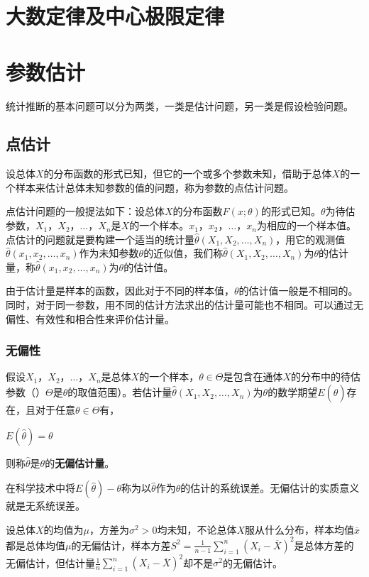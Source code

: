 \documentclass[11pt]{book}
\newcounter{#2}
\newcounter{#2}[#1]
\numberwithin{#2}{#1}
\begin{document}
	\chapter{大数定律及中心极限定律}
	\chapter{参数估计}
	统计推断的基本问题可以分为两类，一类是估计问题，另一类是假设检验问题。
	\section{点估计}
	\begin{newdef}
		设总体$X$的分布函数的形式已知，但它的一个或多个参数未知，借助于总体$X$的一个样本来估计总体未知参数的值的问题，称为参数的点估计问题。
	\end{newdef}
点估计问题的一般提法如下：设总体$X$的分布函数$F(x;\theta)$的形式已知。$\theta$为待估参数，$X_1$，$X_2$，$\dots$，$X_n$是$X$的一个样本。$x_1$，$x_2$，$\dots$，$x_n$为相应的一个样本值。点估计的问题就是要构建一个适当的统计量$\hat{\theta}(X_1,X_2,\dots,X_n)$，用它的观测值$\hat{\theta}(x_1,x_2,\dots,x_n)$作为未知参数$\theta$的近似值，我们称$\hat{\theta}(X_1,X_2,\dots,X_n)$为$\theta$的估计量，称$\hat{\theta}(x_1,x_2,\dots,x_n)$为$\theta$的估计值。

由于估计量是样本的函数，因此对于不同的样本值，$\theta$的估计值一般是不相同的。同时，对于同一参数，用不同的估计方法求出的估计量可能也不相同。可以通过无偏性、有效性和相合性来评价估计量。
\subsection{无偏性}
\begin{newdef}
	假设$X_1$，$X_2$，$\dots$，$X_n$是总体$X$的一个样本，$\theta\in\Theta$是包含在通体$X$的分布中的待估参数（）$\Theta$是$\theta$的取值范围）。若估计量$\hat{\theta}(X_1,X_2,\dots,X_n)$为$\theta$的数学期望$E(\hat{\theta})$存在，且对于任意$\theta\in\Theta$有，
	\begin{center}
		$E(\hat{\theta})=\theta$
	\end{center}
则称$\hat{\theta}$是$\theta$的\textbf{无偏估计量}。
\end{newdef}

在科学技术中将$E(\hat{\theta})-\theta$称为以$\hat{\theta}$作为$\theta$的估计的系统误差。无偏估计的实质意义就是无系统误差。

设总体$X$的均值为$\mu $，方差为$\sigma^2>0$均未知，不论总体$X$服从什么分布，样本均值$\overline{x}$都是总体均值$\mu $的无偏估计，样本方差$ S^2 =\frac{1}{n-1}\sum\limits_{i=1}^{n}(X_i-\overline{X})^2$是总体方差的无偏估计，但估计量$ \frac{1}{n}\sum\limits_{i=1}^{n}(X_i-\overline{X})^2$却不是$\sigma^2$的无偏估计。
\end{document}
